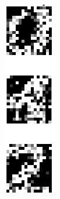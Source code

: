 \documentclass[10pt,a4paper]{article}
\begin{document}
\begin{figure}[htb]
\begin{minipage}{0.08\textwidth}
\end{minipage}%
\begin{minipage}{0.08\textwidth}
\includegraphics[width=\textwidth]{figs/noisy_digits.png}

\end{minipage}
\end{figure}
\end{document}
